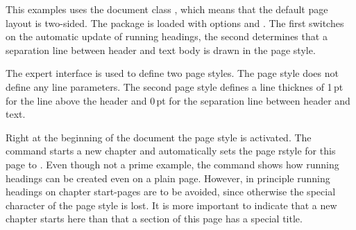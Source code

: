 \begin{Example}
  This examples uses the document class , which means
  that the default page layout is two-sided.  The package
   is loaded with options  and
  .  The first switches on the automatic update of
  running headings, the second determines that a separation line
  between header and text body is drawn in the 
  page style.


  The expert interface is used to define two page styles.  The page
  style  does not define any line parameters.  The
  second page style  defines a line thicknes of 1\,pt
  for the line above the header and 0\,pt for the separation line
  between header and text.

\begin{lstcode}
\end{lstcode}

\begin{lstcode}
\end{lstcode}

  Right at the beginning of the document the page style
   is activated.  The command  starts
  a new chapter and automatically sets the page rstyle for this page to
  . Even though not a prime example, the command
   shows how running headings can be created even on a
  plain page.  However, in principle running headings on
  chapter start-pages are to be avoided, since otherwise the special
  character of the  page style is lost. It is more
  important to indicate that a new chapter starts here than that a
  section of this page has a special title.


\end{Example}
